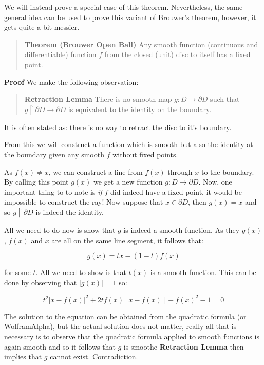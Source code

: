 \documentclass[letterpaper,12pt]{article}
\begin{document}
We will instead prove a special case of this theorem. Nevertheless, the same general idea can be used to prove this variant of Brouwer's theorem, however, it gets quite a bit messier.

\begin{quote}
    \textbf{Theorem (Brouwer Open Ball)} Any smooth function (continuous and differentiable) function $f$ from the closed (unit) disc to itself has a fixed point.
\end{quote}

\textbf{Proof} We make the following observation: 

\begin{quote}
    \textbf{Retraction Lemma} There is no smooth map $g : D \to \partial D$ such that $g \upharpoonright \partial D \to \partial D$ is equivalent to the identity on the boundary.
\end{quote}

It is often stated as: there is no way to retract the disc to it's boundary.

From this we will construct a function which is smooth but also the identity at the boundary given any smooth $f$ without fixed points.

As $f(x) \neq x$, we can construct a line from $f(x)$ through $x$ to the boundary. By calling this point $g(x)$ we get a new function $g : D \to \partial D$. Now, one important thing to to note is \textit{if} $f$ did indeed have a fixed point, it would be impossible to construct the ray! Now suppose that $x \in \partial D$, then $g(x) = x$ and so $g \upharpoonright \partial D$ is indeed the identity.

All we need to do now is show that $g$ is indeed a smooth function. As they $g(x)$, $f(x)$ and $x$ are all on the same line segment, it follows that:

$$g(x) = tx - (1 - t)f(x)$$

for some $t$. All we need to show is that $t(x)$ is a smooth function. This can be done by observing that $|g(x)| = 1$ so:

$$t^2|x - f(x)|^2 + 2tf(x)[x - f(x)] + f(x)^2 - 1 = 0$$

The solution to the equation can be obtained from the quadratic formula (or WolframAlpha), but the actual solution does not matter, really all that is necessary is to observe that the quadratic formula applied to smooth functions is again smooth and so it follows that $g$ is smoothe \textbf{Retraction Lemma} then implies that $g$ cannot exist. Contradiction.
\end{document}
